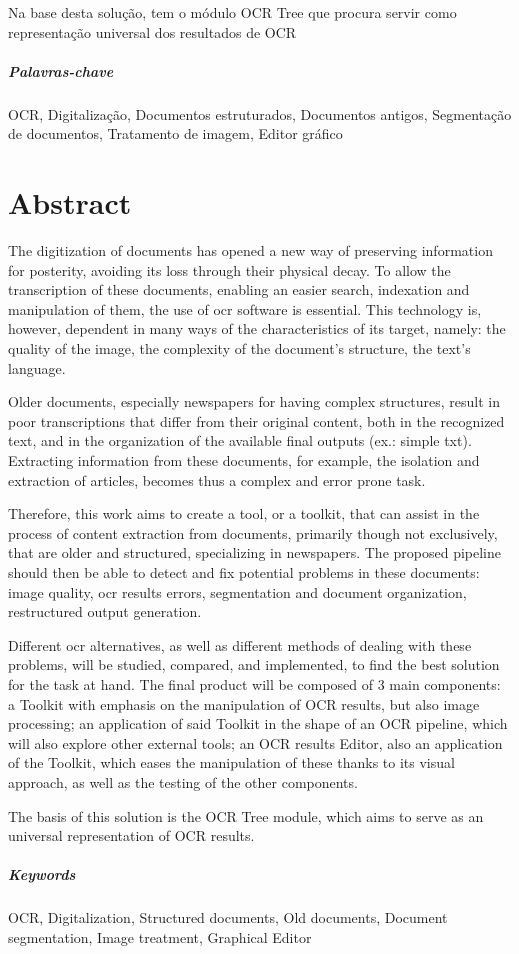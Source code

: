 Na base desta solução, tem o módulo OCR Tree que procura servir como representação universal dos resultados de OCR


\paragraph{Palavras-chave} OCR, Digitalização, Documentos estruturados, Documentos antigos, Segmentação de documentos, Tratamento de imagem, Editor gráfico

\cleardoublepage

\chapter*{Abstract}

The digitization of documents has opened a new way of preserving information for posterity, avoiding its loss through their physical decay. To allow the transcription of these documents, enabling an easier search, indexation and manipulation of them, the use of \acrshort{ocr} software is essential. This technology is, however, dependent in many ways of the characteristics of its target, namely: the quality of the image, the complexity of the document's structure, the text's language. 

Older documents, especially newspapers for having complex structures, result in poor transcriptions that differ from their original content, both in the recognized text, and in the organization of the available final outputs (ex.: simple txt).
Extracting information from these documents, for example, the isolation and extraction of articles, becomes thus a complex and error prone task. 

Therefore, this work aims to create a tool, or a toolkit, that can assist in the process of content extraction from documents, primarily though not exclusively, that are older and structured, specializing in newspapers. The proposed pipeline should then be able to detect and fix potential problems in these documents: image quality, \acrshort{ocr} results errors, segmentation and document organization, restructured output generation.

Different \acrshort{ocr} alternatives, as well as different methods of dealing with these problems, will be studied, compared, and implemented, to find the best solution for the task at hand. The final product will be composed of 3 main components: a Toolkit with emphasis on the manipulation of OCR results, but also image processing; an application of said Toolkit in the shape of an OCR pipeline, which will also explore other external tools; an OCR results Editor, also an application of the Toolkit, which eases the manipulation of these thanks to its visual approach, as well as the testing of the other components.

The basis of this solution is the OCR Tree module, which aims to serve as an universal representation of OCR results.


\paragraph{Keywords} OCR, Digitalization, Structured documents, Old documents, Document segmentation, Image treatment, Graphical Editor

\cleardoublepage
